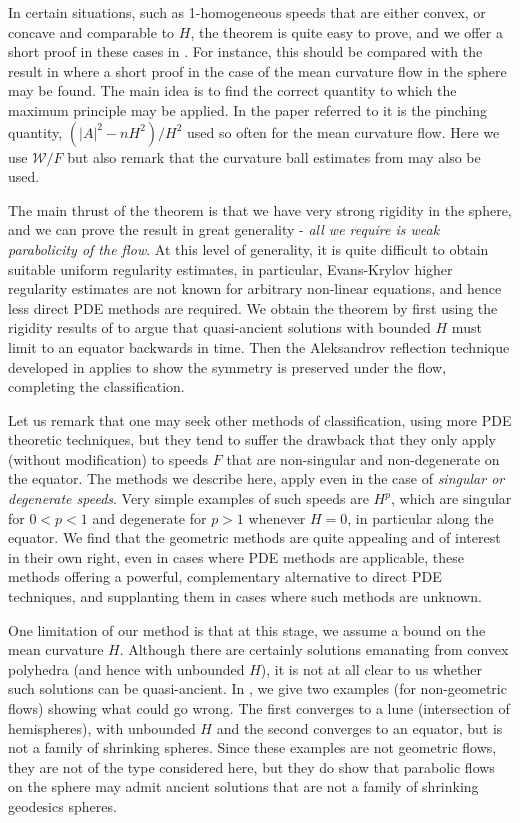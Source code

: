 \documentclass{amsart}
\begin{document}
In certain situations, such as 1-homogeneous speeds that are either convex, or concave and comparable to \(H\), the theorem is quite easy to prove, and we offer a short proof in these cases in . For instance, this should be compared with the result in \cite[Theorem 6.1]{HuiskenSinestrari:10/2015} where a short proof in the case of the mean curvature flow in the sphere may be found. The main idea is to find the correct quantity to which the maximum principle may be applied. In the paper referred to it is the pinching quantity, \((|A|^2 - n H^2)/H^2\) used so often for the mean curvature flow. Here we use \(\mathcal{W}/F\) but also remark that the curvature ball estimates from \cite{AndrewsHanLiWei:/2015} may also be used.

The main thrust of the theorem is that we have very strong rigidity in the sphere, and we can prove the result in great generality - \emph{all we require is weak parabolicity of the flow}. At this level of generality, it is quite difficult to obtain suitable uniform regularity estimates, in particular, Evans-Krylov higher regularity estimates are not known for arbitrary non-linear equations, and hence less direct PDE methods are required. We obtain the theorem by first using the rigidity results of \cite{MakowskiScheuer:/2013} to argue that quasi-ancient solutions with bounded \(H\) must limit to an equator backwards in time. Then the Aleksandrov reflection technique developed in \cite{BryanIvaki:08/2015,BryanLouie:04/2016} applies to show the symmetry is preserved under the flow, completing the classification.

Let us remark that one may seek other methods of classification, using more PDE theoretic techniques, but they tend to suffer the drawback that they only apply (without modification) to speeds \(F\) that are non-singular and non-degenerate on the equator. The methods we describe here, apply even in the case of \emph{singular or degenerate speeds}. Very simple examples of such speeds are \(H^p\), which are singular for \(0 < p < 1\) and degenerate for \(p > 1\) whenever \(H = 0\), in particular along the equator. We find that the geometric methods are quite appealing and of interest in their own right, even in cases where PDE methods are applicable, these methods offering a powerful, complementary alternative to direct PDE techniques, and supplanting them in cases where such methods are unknown.

One limitation of our method is that at this stage, we assume a bound on the mean curvature \(H\). Although there are certainly solutions emanating from convex polyhedra (and hence with unbounded \(H\)), it is not at all clear to us whether such solutions can be quasi-ancient. In , we give two examples (for non-geometric flows) showing what could go wrong. The first converges to a lune (intersection of hemispheres), with unbounded \(H\) and the second converges to an equator, but is not a family of shrinking spheres. Since these examples are not geometric flows, they are not of the type considered here, but they do show that parabolic flows on the sphere may admit ancient solutions that are not a family of shrinking geodesics spheres.
\end{document}
